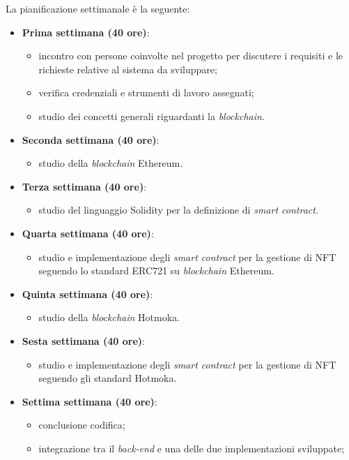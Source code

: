 \noindent La pianificazione settimanale è la seguente: 
\begin{itemize}
  \item \textbf{Prima settimana (40 ore)}:
  \begin{itemize}
      \item incontro con persone coinvolte nel progetto per discutere i requisiti e le richieste relative al sistema da sviluppare;
      \item verifica credenziali e strumenti di lavoro assegnati;
      \item studio dei concetti generali riguardanti la \textit{blockchain}.
  \end{itemize}
  \item \textbf{Seconda settimana (40 ore)}:
  \begin{itemize}
      \item studio della \textit{blockchain} Ethereum.
  \end{itemize}
  \item \textbf{Terza settimana (40 ore)}:
  \begin{itemize}
      \item studio del linguaggio Solidity per la definizione di \textit{smart contract}.
  \end{itemize}
  \item \textbf{Quarta settimana (40 ore)}:
  \begin{itemize}
      \item studio e implementazione degli \textit{smart contract} per la gestione di NFT seguendo lo standard ERC721 su \textit{blockchain} Ethereum.
  \end{itemize}
  \item \textbf{Quinta settimana (40 ore)}:
  \begin{itemize}
      \item studio della \textit{blockchain} Hotmoka.
  \end{itemize}
  \item \textbf{Sesta settimana (40 ore)}:
  \begin{itemize}
      \item studio e implementazione degli \textit{smart contract} per la gestione di NFT seguendo gli standard Hotmoka.
  \end{itemize}
  \item \textbf{Settima settimana (40 ore)}:
  \begin{itemize}
      \item conclusione codifica;
      \item integrazione tra il \textit{back-end} e una delle due implementazioni sviluppate;

\end{itemize}
\end{itemize}
